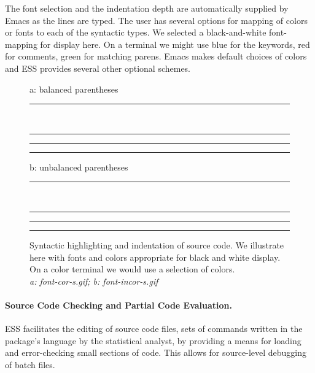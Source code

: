 \documentclass{article}
\newcommand{\emptyfig}{
\hspace*{42pt}\rule{324pt}{.25pt}\\
\hspace*{42pt}\rule{.25pt}{10pc}
\rule{316pt}{.25pt}
\rule{.25pt}{10pc}}
\begin{document}
The font selection and the indentation depth are automatically
supplied by Emacs as the lines are typed.  The user has several
options for mapping of colors or fonts to each of the syntactic types.
We selected a black-and-white font-mapping for display here.  On a
terminal we might use blue for the keywords, red for comments, green
for matching parens.  Emacs makes default choices of colors and ESS
provides several other optional schemes.

\begin{figure}
a: balanced parentheses\\
\emptyfig

b: unbalanced parentheses\\
\emptyfig
\caption[place holder for a long caption]{Syntactic highlighting and
indentation of source code.  We illustrate here with fonts and colors
appropriate for black and white display.  On a color terminal we would
use a selection of colors.\\
{\it a: font-cor-s.gif; b: font-incor-s.gif}
\label{f.font}}
\end{figure}

\paragraph{Source Code Checking and Partial Code Evaluation.}

ESS facilitates the editing of source code files, sets of commands
written in the package's language by the statistical analyst, by
providing a means for loading and error-checking small sections of
code.  This allows for source-level debugging of batch files.
\end{document}
